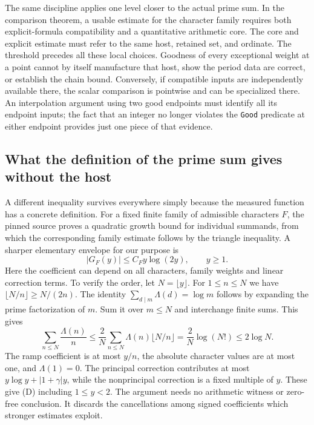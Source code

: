 \documentclass[12pt,letterpaper]{article}
\begin{document}
The same discipline applies one level closer to the actual prime sum. In the comparison theorem, a usable estimate for the character family requires both explicit-formula compatibility and a quantitative arithmetic core. The core and explicit estimate must refer to the same host, retained set, and ordinate. The threshold precedes all these local choices. Goodness of every exceptional weight at a point cannot by itself manufacture that host, show the period data are correct, or establish the chain bound. Conversely, if compatible inputs are independently available there, the scalar comparison is pointwise and can be specialized there. An interpolation argument using two good endpoints must identify all its endpoint inputs; the fact that an integer no longer violates the \texttt{Good} predicate at either endpoint provides just one piece of that evidence.   

\subsection{What the definition of the prime sum gives without the host}
A different inequality survives everywhere simply because the measured function has a concrete definition. For a fixed finite family of admissible characters \(F\), the pinned source proves a quadratic growth bound for individual summands, from which the corresponding family estimate follows by the triangle inequality. A sharper elementary envelope for our purpose is
\[
                      |G_F(y)| \le C_F y\log(2y),\qquad y\ge1.
 \tag{D}\label{eq:band-elem}
\]
Here the coefficient can depend on all characters, family weights and linear correction terms. To verify the order, let \(N=\lfloor y\rfloor\). For \(1\le n\le N\) we have \(\lfloor N/n\rfloor\ge N/(2n)\). The identity \(\sum_{d\mid m}\Lambda(d)=\log m\) follows by expanding the prime factorization of \(m\). Sum it over \(m\le N\) and interchange finite sums. This gives
\[
      \sum_{n\le N}\frac{\Lambda(n)}{n}
       \le\frac{2}{N}\sum_{n\le N}\Lambda(n)\lfloor N/n\rfloor
       =\frac{2}{N}\log(N!)\le2\log N .
\]
The ramp coefficient is at most \(y/n\), the absolute character values are at most one, and \(\Lambda(1)=0\). The principal correction contributes at most \(y\log y+|1+\gamma|y\), while the nonprincipal correction is a fixed multiple of \(y\). These give (D) including \(1\le y<2\). The argument needs no arithmetic witness or zero-free conclusion. It discards the cancellations among signed coefficients which stronger estimates exploit.  
\end{document}
